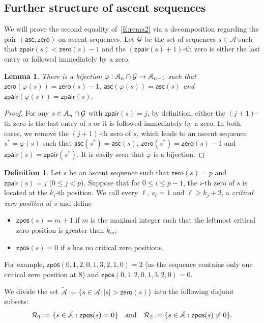 \documentclass[12pt]{amsart}
\newcounter{mycount}
\theoremstyle{plain}
\newtheorem{lemma}[mycount]{Lemma}
\theoremstyle{definition}
\newtheorem{definition}{Definition}
\theoremstyle{example}
\theoremstyle{remark}
\numberwithin{equation}{section}
\numberwithin{figure}{section}
\newcommand{\asc}{\mathsf{asc}}
\def\zero{\mathsf{zero}}
\def\zpair{\mathsf{zpair}}
\def\zpos{\mathsf{zpos}}
\def\A{\mathcal{A}}
\begin{document}
\subsection{Further structure of ascent sequences}
We will prove the second equality of~\eqref{E:rema2} via a decomposition  regarding the pair $(\asc,\zero)$ on ascent sequences.
 Let $\CMcal{G}$ be the set of sequences $s\in\A$ such that $\zpair(s)<\zero(s)-1$ and the $(\mathsf{zpair}(s)+1)$-th zero is either the last entry or followed immediately by a zero.
\begin{lemma}\label{L:c4}
There is a bijection $\varphi: \A_{n}\cap \CMcal{G}\rightarrow\A_{n-1}$ such that $\zero(\varphi(s))=\zero(s)-1$, $\asc(\varphi(s))=\asc(s)$ and $\zpair(\varphi(s))=\zpair(s)$.

\end{lemma}
\begin{proof}
For any $s\in \A_{n}\cap \CMcal{G}$ with $\mathsf{zpair}(s)=j$, by definition, either the $(j+1)$-th zero is the last entry of $s$ or it is followed immediately by a zero. In both cases, we remove the $(j+1)$-th zero of $s$, which leads to an ascent sequence $s^*=\varphi(s)$ such that $\asc(s^*)=\asc(s)$, $\zero(s^*)=\zero(s)-1$ and $\mathsf{zpair}(s)=\mathsf{zpair}(s^*)$. It is easily seen that $\varphi$ is a bijection.
\end{proof}

\begin{definition}
Let $s$ be an ascent sequence such that $\zero(s)=p$ and $\mathsf{zpair}(s)=j$ ($0\le j< p$). Suppose that for $0\le i\le p-1$, the $i$-th zero of $s$ is located at the $k_{i}$-th position. We call every $\ell$,  $s_{\ell}=1$ and $\ell\ge k_j+2$, a {\em critical zero position} of $s$ and define
\begin{itemize}
\item $\mathsf{zpos}(s)=m+1$ if $m$ is the maximal integer such that the leftmost critical zero position is greater than $k_{m}$;
\item $\mathsf{zpos}(s)=0$ if $s$ has no critical zero positions.
\end{itemize}
For example, $\zpos(0,1,2,0,1,3,2,1,0)=2$ (as the sequence  contains only one critical zero  position at $8$) and $\zpos(0,1,2,0,1,3,2,0)=0$.
\end{definition}






We divide the set  $\tilde{\A}:=\{s\in\A: |s|>\zero(s)\}$ into the following disjoint subsets:
$$
\CMcal{R}_1:=\{s\in\tilde{\A}:  \mathsf{zpos}(s)=0\}\quad\text{and}\quad\CMcal{R}_2:=\{s\in\tilde{\A}:  \mathsf{zpos}(s)\ne0\}.
$$
\end{document}
